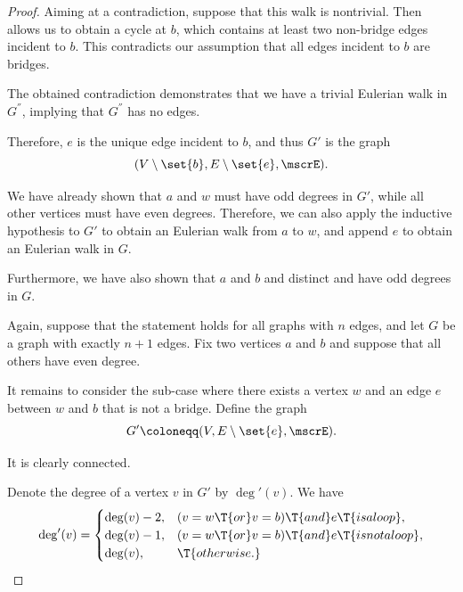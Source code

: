 \begin{proof}
  Aiming at a contradiction, suppose that this walk is nontrivial. Then  allows us to obtain a cycle at \( b \), which contains at least two non-bridge edges incident to \( b \). This contradicts our assumption that all edges incident to \( b \) are bridges.

  The obtained contradiction demonstrates that we have a trivial Eulerian walk in \( G^\dprime \), implying that \( G^\dprime \) has no edges.

  Therefore, \( e \) is the unique edge incident to \( b \), and thus \( G' \) is the graph
  \begin{equation*}
    (V \setminus \set{ b }, E \setminus \set{ e }, \mscrE).
  \end{equation*}

  We have already shown that \( a \) and \( w \) must have odd degrees in \( G' \), while all other vertices must have even degrees. Therefore, we can also apply the inductive hypothesis to \( G' \) to obtain an Eulerian walk from \( a \) to \( w \), and append \( e \) to obtain an Eulerian walk in \( G \).

  Furthermore, we have also shown that \( a \) and \( b \) and distinct and have odd degrees in \( G \).

   Again, suppose that the statement holds for all graphs with \( n \) edges, and let \( G \) be a graph with exactly \( n + 1 \) edges. Fix two vertices \( a \) and \( b \) and suppose that all others have even degree.

  It remains to consider the sub-case where there exists a vertex \( w \) and an edge \( e \) between \( w \) and \( b \) that is not a bridge. Define the graph
  \begin{equation*}
    G' \coloneqq (V, E \setminus \set{ e }, \mscrE).
  \end{equation*}

  It is clearly connected.

  Denote the degree of a vertex \( v \) in \( G' \) by \( \deg'(v) \). We have
  \begin{equation}\label{eq:thm:eulers_theorem_for_graphs/proof/necessity/deg}
    \deg'(v) = \begin{cases}
      \deg(v) - 2, &(v = w \T{or} v = b) \T{and} e \T{is a loop}, \\
      \deg(v) - 1, &(v = w \T{or} v = b) \T{and} e \T{is not a loop}, \\
      \deg(v),     &\T{otherwise.}
    \end{cases}
  \end{equation}


\end{proof}

